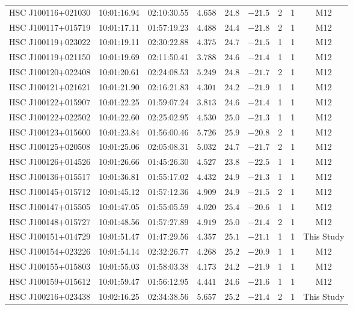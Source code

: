 \documentclass[]{pasj01}
\begin{document}
{\begin{longtable}{ccccccccc}
HSC J100116+021030 & 10:01:16.94 & 02:10:30.55 & $4.658$ & $24.8$ & $-21.5$ & 2 & 1 & M12 \\
HSC J100117+015719 & 10:01:17.11 & 01:57:19.23 & $4.488$ & $24.4$ & $-21.8$ & 2 & 1 & M12 \\
HSC J100119+023022 & 10:01:19.11 & 02:30:22.88 & $4.375$ & $24.7$ & $-21.5$ & 1 & 1 & M12 \\
HSC J100119+021150 & 10:01:19.69 & 02:11:50.41 & $3.788$ & $24.6$ & $-21.4$ & 1 & 1 & M12 \\
HSC J100120+022408 & 10:01:20.61 & 02:24:08.53 & $5.249$ & $24.8$ & $-21.7$ & 2 & 1 & M12 \\
HSC J100121+021621 & 10:01:21.90 & 02:16:21.83 & $4.301$ & $24.2$ & $-21.9$ & 1 & 1 & M12 \\
HSC J100122+015907 & 10:01:22.25 & 01:59:07.24 & $3.813$ & $24.6$ & $-21.4$ & 1 & 1 & M12 \\
HSC J100122+022502 & 10:01:22.60 & 02:25:02.95 & $4.530$ & $25.0$ & $-21.3$ & 1 & 1 & M12 \\
HSC J100123+015600 & 10:01:23.84 & 01:56:00.46 & $5.726$ & $25.9$ & $-20.8$ & 2 & 1 & M12 \\
HSC J100125+020508 & 10:01:25.06 & 02:05:08.31 & $5.032$ & $24.7$ & $-21.7$ & 2 & 1 & M12 \\
HSC J100126+014526 & 10:01:26.66 & 01:45:26.30 & $4.527$ & $23.8$ & $-22.5$ & 1 & 1 & M12 \\
HSC J100136+015517 & 10:01:36.81 & 01:55:17.02 & $4.432$ & $24.9$ & $-21.3$ & 1 & 1 & M12 \\
HSC J100145+015712 & 10:01:45.12 & 01:57:12.36 & $4.909$ & $24.9$ & $-21.5$ & 2 & 1 & M12 \\
HSC J100147+015505 & 10:01:47.05 & 01:55:05.59 & $4.020$ & $25.4$ & $-20.6$ & 1 & 1 & M12 \\
HSC J100148+015727 & 10:01:48.56 & 01:57:27.89 & $4.919$ & $25.0$ & $-21.4$ & 2 & 1 & M12 \\
HSC J100151+014729 & 10:01:51.47 & 01:47:29.56 & $4.357$ & $25.1$ & $-21.1$ & 1 & 1 & This Study \\
HSC J100154+023226 & 10:01:54.14 & 02:32:26.77 & $4.268$ & $25.2$ & $-20.9$ & 1 & 1 & M12 \\
HSC J100155+015803 & 10:01:55.03 & 01:58:03.38 & $4.173$ & $24.2$ & $-21.9$ & 1 & 1 & M12 \\
HSC J100159+015612 & 10:01:59.47 & 01:56:12.95 & $4.441$ & $24.6$ & $-21.6$ & 1 & 1 & M12 \\
HSC J100216+023438 & 10:02:16.25 & 02:34:38.56 & $5.657$ & $25.2$ & $-21.4$ & 2 & 1 & This Study \\

\end{longtable}}
\end{document}
